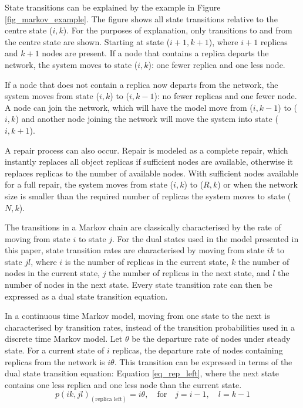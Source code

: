 \documentclass[10pt,a4paper,conference]{IEEEtran}
\begin{document}
State transitions can be explained by the example in Figure \ref{fig_markov_example}. The figure shows all state transitions relative to the centre state ($i,k$). For the purposes of explanation, only transitions to and from the centre state are shown. Starting at state ($i+1,k+1$), where $i+1$ replicas and $k+1$ nodes are present. If a node that contains a replica departs the network, the system moves to state ($i,k$): one fewer replica and one less node.

If a node that does not contain a replica now departs from the network, the system moves from state ($i,k$) to ($i,k-1$): no fewer replicas and one fewer node. A node can join the network, which will have the model move from ($i,k-1$) to ($i,k$) and another node joining the network will move the system into state ($i,k+1$).

A repair process can also occur. Repair is modeled as a complete repair, which instantly replaces all object replicas if sufficient nodes are available, otherwise it replaces replicas to the number of available nodes. With sufficient nodes available for a full repair, the system moves from state ($i,k$) to ($R,k$) or when the network size is smaller than the required number of replicas the system moves to state ($N,k$).

The transitions in a Markov chain are classically characterised by the rate of moving from state $i$ to state $j$. For the dual states used in the model presented in this paper, state transition rates are characterised by moving from state $i k$ to state $j l$, where $i$ is the number of replicas in the current state, $k$ the number of nodes in the current state, $j$ the number of replicas in the next state, and $l$ the number of nodes in the next state. Every state transition rate can then be expressed as a dual state transition equation.

In a continuous time Markov model, moving from one state to the next is characterised by transition rates, instead of the transition probabilities used in a discrete time Markov model. Let $\theta$ be the departure rate of nodes under steady state. For a current state of $i$ replicas, the departure rate of nodes containing replicas from the network is $i\theta$. This transition can be expressed in terms of the dual state transition equation: Equation \eqref{eq_rep_left}, where the next state contains one less replica and one less node than the current state.
%
\begin{equation} \label{eq_rep_left}
    p(i k,j l)_{(\textrm{replica left})} = i\theta,\quad\textrm{for}\quad j = i - 1,\quad l = k - 1
\end{equation}
\end{document}
